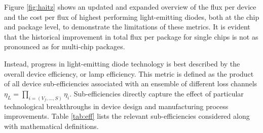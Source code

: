 \documentclass[a4paper,nocompress]{spie}  %
\begin{document}
    Figure \ref{fig:haitz} shows an updated and expanded overview of the flux per device and the cost per flux of highest performing light-emitting diodes, both at the chip and package level, to demonstrate the limitations of these metrics. It is evident that the historical improvement in total flux per package for single chips is not as pronounced as for multi-chip packages.

    Instead, progress in light-emitting diode technology is best described by the overall device efficiency, or lamp efficiency. This metric is defined as the product of all device sub-efficiencies associated with an ensemble of different loss channels $\eta_L = \prod_{i=(V_f,\dots,S)} \eta_i$. Sub-efficiencies directly capture the effect of particular technological breakthroughs in device design and manufacturing process improvements. Table \ref{tab:eff} lists the relevant sub-efficiencies considered along with mathematical definitions.
    
\end{document}
